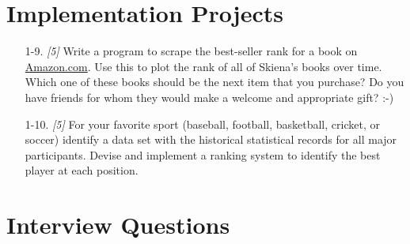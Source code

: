 \documentclass[10pt]{article}
\begin{document}

\section*{Implementation Projects}

\begin{enumerate}
    \item[1-9.] \textit{[5]} Write a program to scrape the best-seller rank for a book on \href{http://Amazon.com}{Amazon.com}. Use this to plot the rank of all of Skiena’s books over time. Which one of these books should be the next item that you purchase? Do you have friends for whom they would make a welcome and appropriate gift? :-)

    \item[1-10.] \textit{[5]} For your favorite sport (baseball, football, basketball, cricket, or soccer) identify a data set with the historical statistical records for all major participants. Devise and implement a ranking system to identify the best player at each position.
\end{enumerate}

\section*{Interview Questions}
\end{document}
